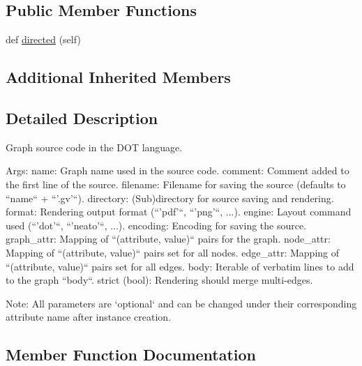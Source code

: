 \subsection*{Public Member Functions}
\begin{DoxyCompactItemize}
\item 
def \hyperlink{classgraphviz_1_1dot_1_1Graph_abd62a87409089f07066a3d78214b37c9}{directed} (self)
\end{DoxyCompactItemize}
\subsection*{Additional Inherited Members}


\subsection{Detailed Description}
\begin{DoxyVerb}Graph source code in the DOT language.

Args:
    name: Graph name used in the source code.
    comment: Comment added to the first line of the source.
    filename: Filename for saving the source (defaults to ``name`` + ``'.gv'``).
    directory: (Sub)directory for source saving and rendering.
    format: Rendering output format (``'pdf'``, ``'png'``, ...).
    engine: Layout command used (``'dot'``, ``'neato'``, ...).
    encoding: Encoding for saving the source.
    graph_attr: Mapping of ``(attribute, value)`` pairs for the graph.
    node_attr: Mapping of ``(attribute, value)`` pairs set for all nodes.
    edge_attr: Mapping of ``(attribute, value)`` pairs set for all edges.
    body: Iterable of verbatim lines to add to the graph ``body``.
    strict (bool): Rendering should merge multi-edges.

Note:
    All parameters are `optional` and can be changed under their
    corresponding attribute name after instance creation.
\end{DoxyVerb}
 

\subsection{Member Function Documentation}
\mbox{\label{classgraphviz_1_1dot_1_1Graph_abd62a87409089f07066a3d78214b37c9}} 
